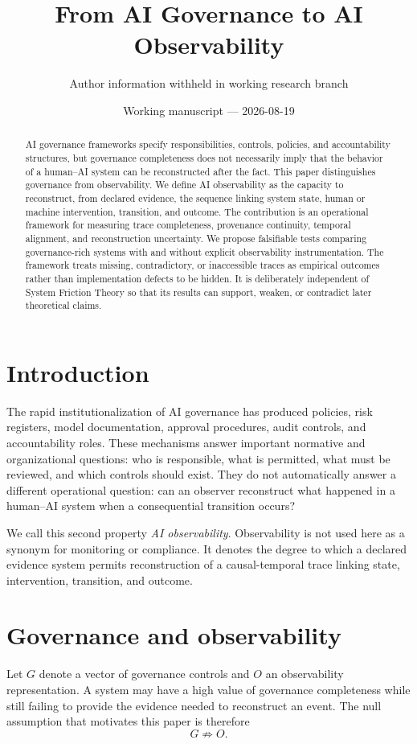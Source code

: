 \documentclass[11pt]{article}
\title{From AI Governance to AI Observability}
\author{Author information withheld in working research branch}
\date{Working manuscript --- 2026-08-19}
\begin{document}
\maketitle

\begin{abstract}
AI governance frameworks specify responsibilities, controls, policies, and accountability structures, but governance completeness does not necessarily imply that the behavior of a human--AI system can be reconstructed after the fact. This paper distinguishes governance from observability. We define AI observability as the capacity to reconstruct, from declared evidence, the sequence linking system state, human or machine intervention, transition, and outcome. The contribution is an operational framework for measuring trace completeness, provenance continuity, temporal alignment, and reconstruction uncertainty. We propose falsifiable tests comparing governance-rich systems with and without explicit observability instrumentation. The framework treats missing, contradictory, or inaccessible traces as empirical outcomes rather than implementation defects to be hidden. It is deliberately independent of System Friction Theory so that its results can support, weaken, or contradict later theoretical claims.
\end{abstract}

\section{Introduction}
The rapid institutionalization of AI governance has produced policies, risk registers, model documentation, approval procedures, audit controls, and accountability roles. These mechanisms answer important normative and organizational questions: who is responsible, what is permitted, what must be reviewed, and which controls should exist. They do not automatically answer a different operational question: can an observer reconstruct what happened in a human--AI system when a consequential transition occurs?

We call this second property \emph{AI observability}. Observability is not used here as a synonym for monitoring or compliance. It denotes the degree to which a declared evidence system permits reconstruction of a causal-temporal trace linking state, intervention, transition, and outcome.

\section{Governance and observability}
Let $G$ denote a vector of governance controls and $O$ an observability representation. A system may have a high value of governance completeness while still failing to provide the evidence needed to reconstruct an event. The null assumption that motivates this paper is therefore
\[
G \not\Rightarrow O.
\]
\end{document}
